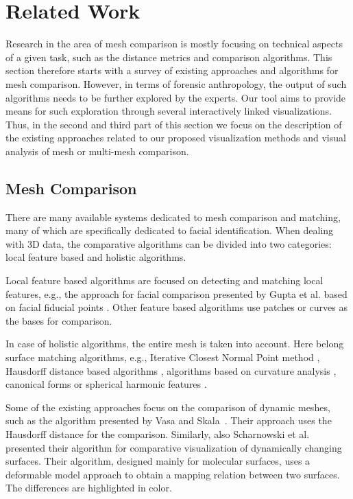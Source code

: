 \documentclass[final,5p,times]{elsarticle}
\begin{document}

\section{Related Work} \label{related}
Research in the area of mesh comparison is mostly focusing on technical aspects of a given task, such as the distance metrics and comparison algorithms.
This section therefore starts with a survey of existing approaches and algorithms for mesh comparison.
However, in terms of forensic anthropology, the output of such algorithms needs to be further explored by the experts.
Our tool aims to provide means for such exploration through several interactively linked visualizations.
Thus, in the second and third part of this section we focus on the description of the existing approaches related to our proposed visualization methods and visual analysis of mesh or multi-mesh comparison.

\subsection{Mesh Comparison}
There are many available systems dedicated to mesh comparison and matching, many of which are specifically dedicated to facial identification. 
When dealing with 3D data, the comparative algorithms can be divided into two categories: local feature based and holistic algorithms.

Local feature based algorithms are focused on detecting and matching local features, e.g., the approach for facial comparison presented by Gupta et al. based on facial fiducial points \cite{gupta2010anthropometric}. 
Other feature based algorithms use patches \cite{guo2016ei3d,chua20003d} or curves \cite{bronstein2005three} as the bases for comparison. 

In case of holistic algorithms, the entire mesh is taken into account.
Here belong surface matching algorithms, e.g., Iterative Closest Normal Point method \cite{mohammadzade2013iterative}, Hausdorff distance based algorithms \cite{huttenlocher1993comparing,pan2003automatic}, algorithms based on curvature analysis \cite{lei20093d,tanaka1998curvature}, canonical forms \cite{bronstein2007expression} or spherical harmonic features \cite{liu2013learning}.

Some of the existing approaches focus on the comparison of dynamic meshes, such as the algorithm presented by Vasa and Skala~\cite{Vasa2006}.
Their approach uses the Hausdorff distance for the comparison.
Similarly, also Scharnowski et al.~\cite{Scharnowski2014} presented their algorithm for comparative visualization of dynamically changing surfaces.
Their algorithm, designed mainly for molecular surfaces, uses a deformable model approach to obtain a mapping relation between two surfaces.
The differences are highlighted in color.
\end{document}
